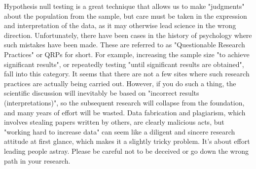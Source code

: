 \documentclass{ltjsbook}
\begin{document}
Hypothesis null testing is a great technique that allows us to make "judgments" about the population from the sample, but care must be taken in the expression and interpretation of the data, as it may otherwise lead science in the wrong direction. Unfortunately, there have been cases in the history of psychology where such mistakes have been made. These are referred to as "Questionable Research Practices" or QRPs for short. For example, increasing the sample size "to achieve significant results", or repeatedly testing "until significant results are obtained", fall into this category. It seems that there are not a few sites where such research practices are actually being carried out. However, if you do such a thing, the scientific discussion will inevitably be based on "incorrect results (interpretations)", so the subsequent research will collapse from the foundation, and many years of effort will be wasted. Data fabrication and plagiarism, which involves stealing papers written by others, are clearly malicious acts, but "working hard to increase data" can seem like a diligent and sincere research attitude at first glance, which makes it a slightly tricky problem. It's about effort leading people astray. Please be careful not to be deceived or go down the wrong path in your research.

\end{document}
